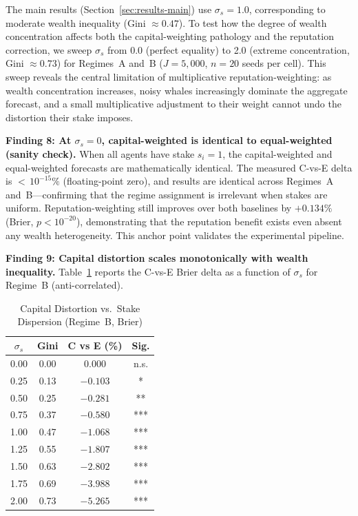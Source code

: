 \documentclass[conference]{IEEEtran}
\begin{document}
The main results (Section~\ref{sec:results-main}) use $\sigma_s = 1.0$, corresponding to moderate wealth inequality (Gini $\approx 0.47$). To test how the degree of wealth concentration affects both the capital-weighting pathology and the reputation correction, we sweep $\sigma_s$ from 0.0 (perfect equality) to 2.0 (extreme concentration, Gini $\approx 0.73$) for Regimes~A and~B ($J = 5{,}000$, $n = 20$ seeds per cell). This sweep reveals the central limitation of multiplicative reputation-weighting: as wealth concentration increases, noisy whales increasingly dominate the aggregate forecast, and a small multiplicative adjustment to their weight cannot undo the distortion their stake imposes.

\smallskip\noindent\textbf{Finding 8: At $\sigma_s = 0$, capital-weighted is identical to equal-weighted (sanity check).} When all agents have stake $s_i = 1$, the capital-weighted and equal-weighted forecasts are mathematically identical. The measured C-vs-E delta is ${<}\,10^{-15}\%$ (floating-point zero), and results are identical across Regimes~A and~B---confirming that the regime assignment is irrelevant when stakes are uniform. Reputation-weighting still improves over both baselines by $+0.134\%$ (Brier, $p < 10^{-20}$), demonstrating that the reputation benefit exists even absent any wealth heterogeneity. This anchor point validates the experimental pipeline.

\smallskip\noindent\textbf{Finding 9: Capital distortion scales monotonically with wealth inequality.} Table~\ref{tab:capital-distortion} reports the C-vs-E Brier delta as a function of $\sigma_s$ for Regime~B (anti-correlated).

\begin{table}[t]
\centering
\caption{Capital Distortion vs.\ Stake Dispersion (Regime~B, Brier)}
\label{tab:capital-distortion}
\begin{tabular}{@{}cccc@{}}
\toprule
$\sigma_s$ & \textbf{Gini} & \textbf{C vs E (\%)} & \textbf{Sig.} \\
\midrule
0.00 & 0.00 & $0.000$   & n.s. \\
0.25 & 0.13 & $-0.103$  & * \\
0.50 & 0.25 & $-0.281$  & ** \\
0.75 & 0.37 & $-0.580$  & *** \\
1.00 & 0.47 & $-1.068$  & *** \\
1.25 & 0.55 & $-1.807$  & *** \\
1.50 & 0.63 & $-2.802$  & *** \\
1.75 & 0.69 & $-3.988$  & *** \\
2.00 & 0.73 & $-5.265$  & *** \\
\bottomrule
\end{tabular}
\end{table}
\end{document}
